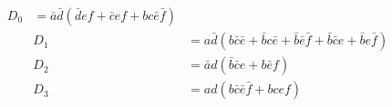 \begin{align}
	D_{0} &=
	\bar{a}\bar{d}(\bar{d}ef+\bar{c}ef+bc\bar{e}\bar{f}) \nonumber \\
	&D_{1} &= 
	a\bar{d}(b\bar{c}\bar{e}+\bar{b}c\bar{e}+\bar{b}\bar{e}\bar{f}+\bar{b}\bar{c}e+\bar{b}e\bar{f}) \nonumber \\
	&D_{2} &=
	\bar{a}d(\bar{b}\bar{c}e+b\bar{e}f) \nonumber \\
	&D_{3} &= 
	ad(b\bar{c}\bar{e}\bar{f}+bcef)
\end{align}